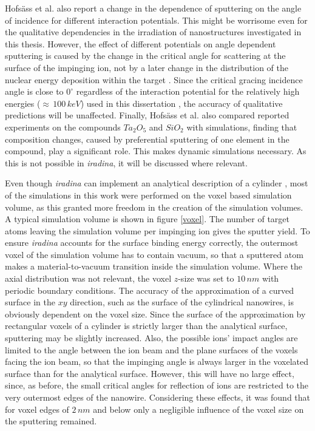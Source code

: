 Hofsäss et al. \cite{hofsass_simulation_2014} also report a change in the dependence of sputtering on the angle of incidence for different interaction potentials. This might be worrisome even for the qualitative dependencies in the irradiation of nanostructures investigated in this thesis. However, the effect of different potentials on angle dependent sputtering is caused by the change in the critical angle for scattering at the surface of the impinging ion, not by a later change in the distribution of the nuclear energy deposition within the target \cite{eckstein_influence_1992}. Since the critical gracing incidence angle is close to $0^\circ$ regardless of the interaction potential for the relatively high energies ($\approx\,100\,keV$) used in this dissertation \cite{yamamura_empirical_1984}, the accuracy of qualitative predictions will be unaffected. Finally, Hofsäss et al. \cite{hofsass_simulation_2014} also compared reported experiments on the compounds $Ta_2O_5$ and $SiO_2$ with simulations, finding that composition changes, caused by preferential sputtering of one element in the compound, play a significant role. This makes dynamic simulations necessary. As this is not possible in \emph{iradina}, it will be discussed where relevant.


Even though \emph{iradina} can implement an analytical description of a cylinder \cite{borschel_ion-solid_2012}, most of the simulations in this work were performed on the voxel based simulation volume, as this granted more freedom in the creation of the simulation volumes. A typical simulation volume is shown in figure \ref{voxel}. The number of target atoms leaving the simulation volume per impinging ion gives the sputter yield. To ensure \emph{iradina} accounts for the surface binding energy correctly, the outermost voxel of the simulation volume has to contain vacuum, so that a sputtered atom makes a material-to-vacuum transition inside the simulation volume. Where the axial distribution was not relevant, the voxel $z$-size was set to $10\,nm$ with periodic boundary conditions. The accuracy of the approximation of a curved surface in the $xy$ direction, such as the surface of the cylindrical nanowires, is obviously dependent on the voxel size. Since the surface of the approximation by rectangular voxels of a cylinder is strictly larger than the analytical surface, sputtering may be slightly increased. Also, the possible ions' impact angles are limited to the angle between the ion beam and the plane surfaces of the voxels facing the ion beam, so that the impinging angle is always larger in the voxelated surface than for the analytical surface. However, this will have no large effect, since, as before, the small critical angles for reflection of ions are restricted to the very outermost edges of the nanowire. Considering these effects, it was found that for voxel edges of $2\,nm$ and below only a negligible influence of the voxel size on the sputtering remained. 

